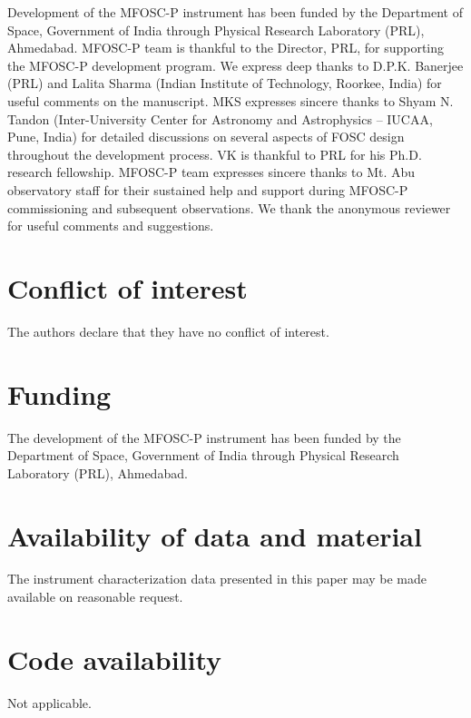 \begin{acknowledgements}
Development of the MFOSC-P instrument has been funded by the Department of Space, Government of India through Physical Research Laboratory (PRL), Ahmedabad. MFOSC-P team is thankful to the Director, PRL, for supporting the MFOSC-P development program.  We express deep thanks to D.P.K. Banerjee (PRL) and Lalita Sharma (Indian Institute of Technology, Roorkee, India) for useful comments on the manuscript. MKS expresses sincere thanks to Shyam N. Tandon (Inter-University Center for Astronomy and Astrophysics – IUCAA, Pune, India) for detailed discussions on several aspects of FOSC design throughout the development process. VK is thankful to PRL for his Ph.D. research fellowship. MFOSC-P team expresses sincere thanks to Mt. Abu observatory staff for their sustained help and support during MFOSC-P commissioning and subsequent observations. We thank the anonymous reviewer for useful comments and suggestions.		
\end{acknowledgements}

 
%
\section*{Conflict of interest}
The authors declare that they have no conflict of interest.
\section*{Funding}
The development of the MFOSC-P instrument has been funded by the Department of Space, Government of India through Physical Research Laboratory (PRL), Ahmedabad.
\section*{Availability of data and material}
The instrument characterization data presented in this paper may be made available on reasonable request.
\section*{Code availability}
Not applicable.









